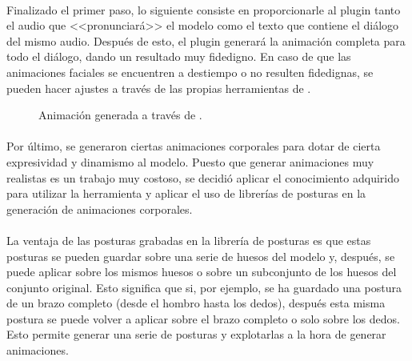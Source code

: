 \documentclass{subfiles}
\begin{document}
    \paragraph{}
    Finalizado el primer paso, lo siguiente consiste en proporcionarle al plugin tanto el audio que <<pronunciará>> el modelo como el texto que contiene el diálogo del mismo audio. Después de esto, el plugin generará la animación completa para todo el diálogo, dando un resultado muy fidedigno. En caso de que las animaciones faciales se encuentren a destiempo o no resulten fidedignas, se pueden hacer ajustes a través de las propias herramientas de \blender.

    \begin{figure}%
    \centering
    \caption{Animación generada a través de \rhubarb.}
    \label{fig:4.2.2_rhubarb}
    \end{figure}

    \paragraph{}
    Por último, se generaron ciertas animaciones corporales para dotar de cierta expresividad y dinamismo al modelo. Puesto que generar animaciones muy realistas es un trabajo muy costoso, se decidió aplicar el conocimiento adquirido para utilizar la herramienta \rhubarb y aplicar el uso de librerías de posturas en la generación de animaciones corporales.

    \paragraph{}
    La ventaja de las posturas grabadas en la librería de posturas es que estas posturas se pueden guardar sobre una serie de huesos del modelo y, después, se puede aplicar sobre los mismos huesos o sobre un subconjunto de los huesos del conjunto original. Esto significa que si, por ejemplo, se ha guardado una postura de un brazo completo (desde el hombro hasta los dedos), después esta misma postura se puede volver a aplicar sobre el brazo completo o solo sobre los dedos. Esto permite generar una serie de posturas y explotarlas a la hora de generar animaciones.
\end{document}
